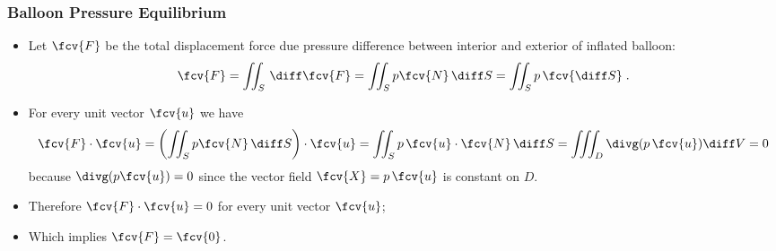 \begin{frame}
  \frametitle{Balloon Pressure Equilibrium}

\begin{itemize}
\item Let $\fcv{F}$ be the total displacement force due pressure difference between interior and exterior of inflated balloon:
%
\[
\fcv{F} =  \iint_S \, \diff \fcv{F} = \iint_S p \fcv{N} \, \diff S = \iint_S p\, \fcv{\diff S} \; .
\]
\item \pause For every unit vector $\fcv{u}$ we have
%
\[
  \fcv{F} \cdot \fcv{u} = \left(\iint_S p \fcv{N} \, \diff S \right) \cdot \fcv{u} = \iint_S p\, \fcv{u} \cdot  \fcv{N} \, \diff S = \iiint_D \divg (p\, \fcv{u}) \diff V = 0
\]
%
because $\divg (p \fcv{u}) = 0$ since the vector field $\fcv{X}= p\, \fcv{u}$ is constant on $D$.
\item Therefore $\fcv{F}\cdot \fcv{u} = 0$ for every unit vector $\fcv{u}$;
    \item \pause Which implies $\fcv{F}=\fcv{0}$.
\end{itemize}

\end{frame}